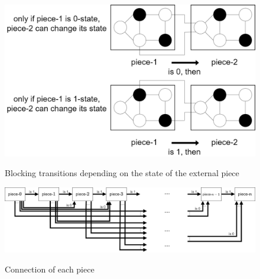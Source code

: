 \documentclass[dvipdfmx,autodetect-engine]{jsarticle}
\begin{document}
\begin{figure}[b]
  \begin{center}
    \caption{Blocking transitions depending on the state of the external piece}
    \includegraphics[scale=0.2]{transitionif.png}
    \label{lednum}
  \end{center} 
\end{figure}


\begin{figure}[b]
  \begin{center}
    \caption{Connection of each piece}
    \includegraphics[scale=0.2]{chain.png}
    \label{lednum}
  \end{center} 
\end{figure}
\end{document}
